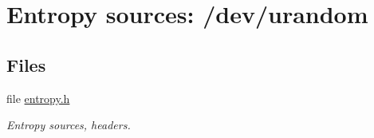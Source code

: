 \hypertarget{group__ES__urandom__m}{
\section{Entropy sources: /dev/urandom}
\label{group__ES__urandom__m}
}
\subsection*{Files}
\begin{CompactItemize}
\item 
file \hyperlink{entropy_8h}{entropy.h}
\begin{CompactList}\small\item\em Entropy sources, headers. \item\end{CompactList}

\end{CompactItemize}
